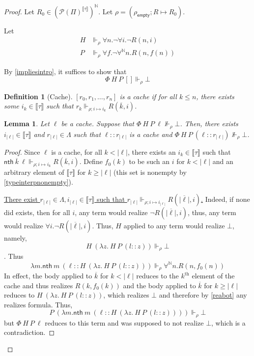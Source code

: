 \documentclass{article}
\newcommand{\N}{\mathbb{N}}
\newcommand{\depforall}[1]{\forall^\N #1.}
\newcommand{\realizes}{\Vdash}
\newcommand{\typeinterp}[1]{{\llbracket #1 \rrbracket}}
\newcommand{\powerset}[1]{\mathcal{P}(#1)}
\newcommand{\emptyval}{{\rho_\mathsf{empty}}}
\newcommand{\nth}{\mathsf{nth}}
\newcommand{\length}[1]{{|#1|}}
\newtheorem{definition}{Definition}
\newtheorem{lemma}{Lemma}
\begin{document}
\begin{proof}
Let $R_0 \in (\powerset{\Pi}^\typeinterp{\tau})^\N$. Let $\rho = (\emptyval; R \mapsto R_0)$.

Let
\begin{align*}
    H & \realizes_\rho \forall n. \neg \forall i. \neg R(n, i) \\
    P & \realizes_\rho \forall f. \neg \depforall{n} R(n, f(n))
\end{align*}

By \cref{impliesintro}, it suffices to show that
\[\Phi\ H\ P\ [] \realizes_\rho \bot \]

\begin{definition}[Cache]
    $[r_0, r_1, \dots, r_n]$ is a cache if for all $k \le n$, there exists some $i_k \in \typeinterp{\tau}$ such that $r_k \realizes_{\rho; i \mapsto i_k} R(\overline{k}, i)$.
\end{definition}

\begin{lemma}\label{growcache}
    Let $\ell$ be a cache.
    Suppose that $\Phi\ H\ P\ \ell \not\realizes_\rho \bot$.
    Then, there exists $i_\length{\ell} \in \typeinterp{\tau}$ and $r_\length{\ell} \in \Lambda$ such that $\ell :: r_\length{\ell}$ is a cache and $\Phi\ H\ P\ (\ell :: r_\length{\ell}) \not\realizes_\rho \bot$.
\end{lemma}

\begin{proof}
    Since $\ell$ is a cache, for all $k < \length{\ell}$, there exists an $i_k \in \typeinterp{\tau}$ such that $\nth\ \overline{k}\ \ell \realizes_{\rho; i \mapsto i_k} R(\overline{k}, i)$. Define $f_0(k)$ to be such an $i$ for $k < \length{\ell}$ and an arbitrary element of $\typeinterp{\tau}$ for $k \ge \length{\ell}$ (this set is nonempty by \cref{typeinterpnonempty}).

    \ul{There exist $r_\length{\ell} \in \Lambda, i_\length{\ell} \in \typeinterp{\tau}$ such that $r_\length{\ell} \realizes_{\rho; i \mapsto i_\length{\ell}} R(\overline{\length\ell}, i)$.}
    Indeed, if none did exists, then for all $i$, any term would realize $\neg R(\overline{\length\ell}, i)$, thus, any term would realize $\forall i. \neg R(\overline{\length{\ell}}, i)$.
    Thus, $H$ applied to any term would realize $\bot$, namely,
    \[ H\ (\lambda z.\ H\ P\ (l :: z)) \realizes_\rho \bot \].
    Thus
    \[\lambda m. \nth\ m\ (\ell :: H\ (\lambda z.\ H\ P\ (l :: z))) \realizes_\rho \depforall{n} R(n, f_0(n))\]
    In effect, the body applied to $\overline{k}$ for $k < \length{\ell}$ reduces to the $k^\text{th}$ element of the cache and thus realizes $R(k, f_0(k))$ and the body applied to $\overline{k}$ for $k \ge \length{\ell}$ reduces to $H\ (\lambda z.\ H\ P\ (l :: z))$, which realizes $\bot$ and therefore by \cref{reabot} any realizes formula.
    Thus,
    \[P\ (\lambda m. \nth\ m\ (\ell :: H\ (\lambda z.\ H\ P\ (l :: z)))) \realizes_\rho \bot\]
    but $\Phi\ H\ P\ \ell$ reduces to this term and was supposed to not realize $\bot$, which is a contradiction.


\end{proof}
\end{proof}
\end{document}
